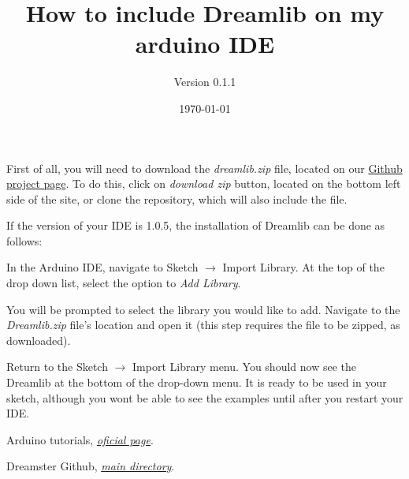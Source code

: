 \documentclass[12pt]{article}
\title{How to include Dreamlib on my arduino IDE}
\subtitle{Version 0.1.1}
\date{\today}
\begin{document}
\maketitle

First of all, you will need to download the \textit{dreamlib.zip} file, 
located on our \href{https://github.com/dreamster/arduino_lib}
{Github project page}. To do this, click on \textit{download zip} button, 
located on the bottom left side of the site, or clone the repository, which 
will also include the file.

If the version of your IDE is 1.0.5, the installation of Dreamlib can be done 
as follows:

In the Arduino IDE, navigate to Sketch $\rightarrow$ Import Library. At the 
top of the drop down list, select the option to \textit{Add Library}. 

You will be prompted to select the library you would like to add. Navigate to 
the \textit{Dreamlib.zip} file's location and open it (this step requires the 
file to be zipped, as downloaded).

Return to the Sketch $\rightarrow$ Import Library menu. You should now see the 
Dreamlib at the bottom of the drop-down menu. It is ready to be used in your 
sketch, although you wont be able to see the examples until after you restart 
your IDE.

\begin{thebibliography}{1}

  Arduino tutorials,
  \emph{\href{http://arduino.cc/en/Guide/Libraries}{oficial page}}.

	
  Dreamster Github,
  \emph{\href{https://github.com/dreamster}{main directory}}.

\end{thebibliography}
\end{document}
